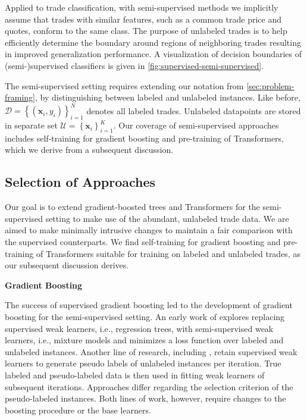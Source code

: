 Applied to trade classification, with semi-supervised methods we implicitly assume that trades with similar features, such as a common trade price and quotes, conform to the same class. The purpose of unlabeled trades is to help efficiently determine the boundary around regions of neighboring trades resulting in improved generalization performance. A visualization of decision boundaries of (semi-)supervised classifiers is given in \cref{fig:supervised-semi-supervised}.

The semi-supervised setting requires extending our notation from \cref{sec:problem-framing}, by distinguishing between labeled and unlabeled instances. Like before, $\mathcal{D}=\left\{\left(\mathbf{x}_i, y_i\right)\right\}_{i=1}^N$ denotes all labeled trades. Unlabeled datapoints are stored in separate set $\mathcal{U} = \left\{\mathbf{x}_i\right\}_{i=1}^{K}$. Our coverage of semi-supervised approaches includes self-training for gradient boosting and pre-training of Transformers, which we derive from a subsequent discussion.

\subsection{Selection of Approaches}\label{sec:selection-of-approaches-1}

Our goal is to extend gradient-boosted trees and Transformers for the semi-supervised setting to make use of the abundant, unlabeled trade data. We are aimed to make minimally intrusive changes to maintain a fair comparison with the supervised counterparts. We find self-training for gradient boosting and pre-training of Transformers suitable for training on labeled and unlabeled trades, as our subsequent discussion derives.

\textbf{Gradient Boosting}

The success of supervised gradient boosting led to the development of gradient boosting for the semi-supervised setting. An early work of \textcite[\checkmark][555--556]{dalche-bucSemisupervisedMarginBoost2001} explores replacing supervised weak learners, i.e., regression trees, with semi-supervised weak learners, i.e., mixture models and minimizes a loss function over labeled and unlabeled instances. Another line of research, including \textcites[\checkmark][290--291]{bennettExploitingUnlabeledData2002}[\checkmark][2003--2004]{mallapragadaSemiBoostBoostingSemiSupervised2009}, retain supervised weak learners to generate pseudo labels of unlabeled instances per iteration. True labeled and pseudo-labeled data is then used in fitting weak learners of subsequent iterations. Approaches differ regarding the selection criterion of the pseudo-labeled instances. Both lines of work, however, require changes to the boosting procedure or the base learners.

